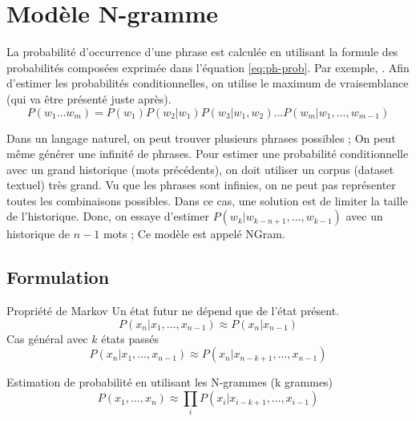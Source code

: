 \documentclass{KodeBook}
\begin{document}
\section{Modèle N-gramme}

La probabilité d'occurrence d'une phrase est calculée en utilisant la formule des probabilités composées exprimée dans l'équation \ref{eq:ph-prob}.
Par exemple, .
Afin d'estimer les probabilités conditionnelles, on utilise le maximum de vraisemblance (qui va être présenté juste après).
\begin{equation}\label{eq:ph-prob}
	P(w_1 \ldots w_m) =  P(w_1) P(w_2 | w_1) P(w_3 | w_1, w_2) \ldots P(w_m | w_1, \ldots, w_{m-1})
\end{equation}

Dans un langage naturel, on peut trouver plusieurs phrases possibles ; On peut même générer une infinité de phrases.
Pour estimer une probabilité conditionnelle avec un grand historique (mots précédents), on doit utiliser un corpus (dataset textuel) très grand. 
Vu que les phrases sont infinies, on ne peut pas représenter toutes les combinaisons possibles. 
Dans ce cas, une solution est de limiter la taille de l'historique. 
Donc, on essaye d'estimer $P(w_k|w_{k-n+1},\ldots,w_{k-1})$ avec un historique de $n-1$ mots ; 
Ce modèle est appelé NGram.

\subsection{Formulation}

\begin{block}{Propriété de Markov}
	Un état futur ne dépend que de l'état présent. 
	\[%
	P(x_n | x_1,\ldots, x_{n-1}) \approx P(x_n | x_{n-1})
	\]
	Cas général avec $k$ états passés 
	\[%
	P(x_n | x_1,\ldots, x_{n-1}) \approx P(x_n | x_{n-k+1}, \ldots, x_{n-1})
	\]
\end{block}

\begin{block}{Estimation de probabilité en utilisant les N-grammes (k grammes)}
	\[
	P(x_1,\ldots, x_{n}) \approx \prod_i P(x_i | x_{i-k+1}, \ldots, x_{i-1})
	\]
\end{block}
\end{document}
